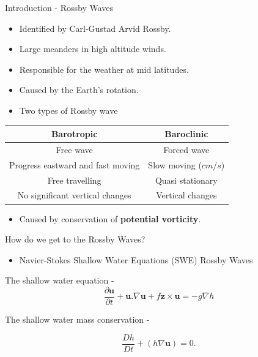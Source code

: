 \documentclass[12pt]{beamer}
\begin{document}
\begin{frame}{Introduction - Rossby Waves}

\begin{itemize}
    \item Identified by Carl-Gustad Arvid Rossby.
    \item Large meanders in high altitude winds.
    \item Responsible for the weather at mid latitudes.
    \item Caused by the Earth's rotation.
    \item Two types of Rossby wave
\end{itemize}

\begin{table}[H]
	\begin{center}
		\begin{tabular}{ |c|c|} 
			\hline
			\textbf{Barotropic} & \textbf{Baroclinic} \\
			\hline 
			Free wave & Forced wave \\  
			Progress eastward and fast moving & Slow moving ($cm/s$) \\
			Free travelling & Quasi stationary \\
			No significant vertical changes & Vertical changes \\
			\hline
		\end{tabular}
	\end{center}
\end{table}

\begin{itemize}
    \item Caused by conservation of \textbf{potential vorticity}.
\end{itemize}

\end{frame}

\begin{frame}{How do we get to the Rossby Waves?}

\begin{itemize}
    \item Navier-Stokes \MVRightarrow  Shallow Water Equations (SWE) \MVRightarrow  Rossby Waves
\end{itemize}

\vspace{15pt}


The shallow water equation -
	\begin{equation}
    	\frac{\partial{\textbf{u}}}{\partial{t}} + \textbf{u}.\nabla\textbf{u} + f \textbf{z} \times \textbf{u} = -g \nabla h
    \end{equation}
    
The shallow water mass conservation - 

\begin{equation}
     	\frac{Dh}{Dt} + (h\nabla \textbf{u}) = 0.
    \end{equation}
    
\end{frame}
\end{document}
